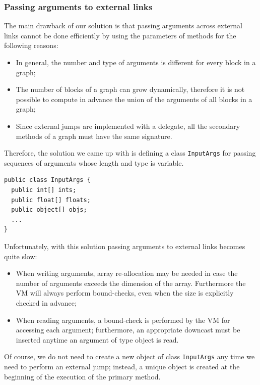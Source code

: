\subsubsection{Passing arguments to external links}

The main drawback of our solution is that passing arguments across
external links cannot be done efficiently by using the parameters of
methods for the following reasons:
\begin{itemize}
\item In general, the number and type of arguments is different for every block in a graph;

\item The number of blocks of a graph can grow dynamically, therefore
  it is not possible to compute in advance the union of the arguments
  of all blocks in a graph; 

\item Since external jumps are implemented with a delegate, all the
  secondary methods of a graph must have the same signature.
\end{itemize}

Therefore, the solution we came up with is defining a class
\lstinline{InputArgs} for passing sequences of arguments whose length
and type is variable.
\begin{small}
\begin{lstlisting}[language={[Sharp]C}] 
public class InputArgs {
  public int[] ints;
  public float[] floats;
  public object[] objs;
  ...
}
\end{lstlisting}
\end{small}
Unfortunately, with this solution passing arguments to external links
becomes quite slow:
\begin{itemize}
\item When writing arguments, array re-allocation may be needed in
  case the number of arguments exceeds the dimension of the
  array. Furthermore the VM will always perform bound-checks, even
  when the size is explicitly checked in advance;

\item When reading arguments, a bound-check is performed by the VM for
  accessing each argument; furthermore, an appropriate downcast must be
  inserted anytime an argument of type object is read.
\end{itemize}
Of course, we do not need to create a new object of class
\lstinline{InputArgs} any time we need to perform an external jump;
instead, a unique object is created at the beginning of the execution
of the primary method. 


